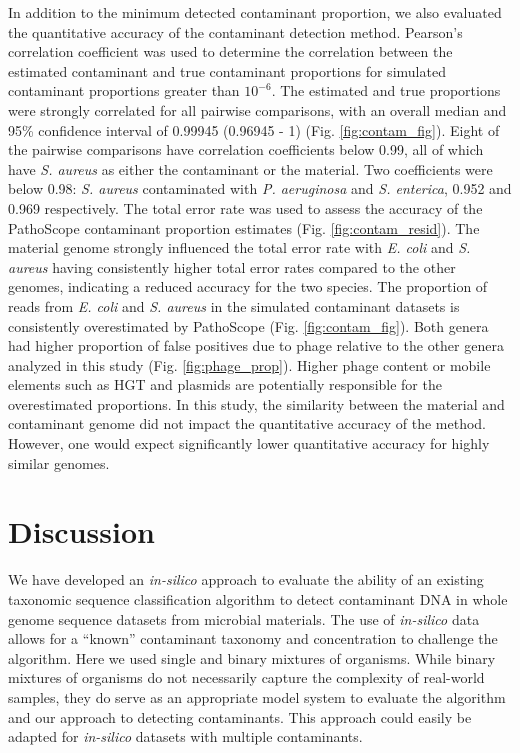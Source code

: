 \documentclass[fleqn,10pt,lineno]{wlpeerj}\usepackage[]{graphicx}\usepackage[]{color}
\begin{document}
In addition to the minimum detected contaminant proportion, we also evaluated the quantitative accuracy of the contaminant detection method.
Pearson's correlation coefficient was used to determine the correlation between the estimated contaminant and true contaminant proportions for simulated contaminant proportions greater than $10^{-6}$.
The estimated and true proportions were strongly correlated for all pairwise comparisons, with an overall median and 95\% confidence interval of 0.99945 (0.96945 - 1) (Fig. \ref{fig:contam_fig}).
Eight of the pairwise comparisons have correlation coefficients below 0.99, all of which have \textit{S. aureus} as either the contaminant or the material.
Two coefficients were below 0.98: \textit{S. aureus} contaminated with \textit{P. aeruginosa} and \textit{S. enterica}, 0.952 and 0.969 respectively.
The total error rate was used to assess the accuracy of the PathoScope contaminant proportion estimates (Fig. \ref{fig:contam_resid}).
The material genome strongly influenced the total error rate with \textit{E. coli} and \textit{S. aureus} having consistently higher total error rates compared to the other genomes, indicating a reduced accuracy for the two species. 
The proportion of reads from \textit{E. coli} and \textit{S. aureus} in the simulated contaminant datasets is consistently overestimated by PathoScope (Fig. \ref{fig:contam_fig}). 
Both genera had higher proportion of false positives due to phage relative to the other genera analyzed in this study (Fig. \ref{fig:phage_prop}). 
Higher phage content or mobile elements such as HGT and plasmids are potentially responsible for the overestimated proportions.
In this study, the similarity between the material and contaminant genome did not impact the quantitative accuracy of the method. 
However, one would expect significantly lower quantitative accuracy for highly similar genomes. 

\section*{Discussion}

We have developed an \textit{in-silico} approach to evaluate the ability of an existing taxonomic sequence classification algorithm to detect contaminant DNA in whole genome sequence datasets from microbial materials. 
The use of \textit{in-silico} data allows for a “known” contaminant taxonomy and concentration to challenge the algorithm. 
Here we used single and binary mixtures of organisms. 
While binary mixtures of organisms do not necessarily capture the complexity of real-world samples, they do serve as an appropriate model system to evaluate the algorithm and our approach to detecting contaminants. 
This approach could easily be adapted for \textit{in-silico} datasets with multiple contaminants.  
\end{document}
